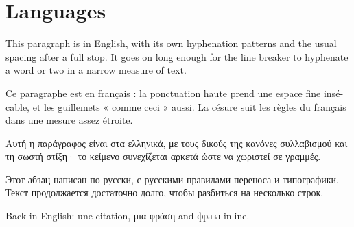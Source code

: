 \documentclass{article}
\begin{document}
\section{Languages}
This paragraph is in English, with its own hyphenation patterns and the
usual spacing after a full stop. It goes on long enough for the line breaker
to hyphenate a word or two in a narrow measure of text.

\begin{french}
Ce paragraphe est en français : la ponctuation haute prend une espace
fine insécable, et les guillemets « comme ceci » aussi. La césure suit les
règles du français dans une mesure assez étroite.
\end{french}

\begin{greek}
Αυτή η παράγραφος είναι στα ελληνικά, με τους δικούς της κανόνες
συλλαβισμού και τη σωστή στίξη· το κείμενο συνεχίζεται αρκετά ώστε να
χωριστεί σε γραμμές.
\end{greek}

\begin{russian}
Этот абзац написан по-русски, с русскими правилами переноса и
типографики. Текст продолжается достаточно долго, чтобы разбиться на
несколько строк.
\end{russian}

Back in English: \textfrench{une citation}, \textgreek{μια φράση} and
\textrussian{фраза} inline.
\end{document}
